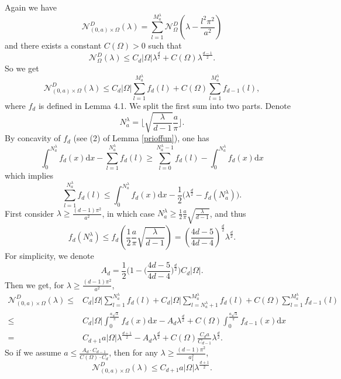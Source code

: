 \documentclass[11pt,letterpaper]{amsart}
\numberwithin{equation}{section}
\theoremstyle{plain}
\theoremstyle{plain}
\numberwithin{equation}{section}
\theoremstyle{remark}
\begin{document}
	Again we have  
	\begin{equation*} \label{333Diri}
		\mathcal N^D_{(0,a)\times \Omega}(\lambda)= \sum_{l=1}^{M_a^\lambda} \mathcal N^D_\Omega (\lambda-\frac{l^2\pi^2}{a^2})
	\end{equation*}
	and	there exists a constant $C(\Omega)>0$ such that 
	\[
	\mathcal N^D_\Omega(\lambda)\le C_d|\Omega|\lambda^{\frac{d}{2}}+ C(\Omega)\lambda^{\frac{d-1}{2}}.
	\] 
	So we get
	\begin{equation}\label{dim3Diri}
		\mathcal N^D_{(0,a)\times \Omega}(\lambda)
		\le 
		C_d |\Omega| \sum_{l=1}^{M_a^\lambda} f_d(l)+ C(\Omega) \sum_{l=1}^{M_a^\lambda}f_{d-1}(l),
	\end{equation}
	where $f_d$ is defined in Lemma 4.1. 
	We split the first sum into two parts. 
	Denote 
	\[N_a^\lambda= \lfloor \sqrt{\frac{\lambda}{d-1}}\frac{a}{\pi} \rfloor.\]
	By concavity of $f_d$ (see (2) of Lemma \ref{prioffun}), one has 
	\[ \int_0^{N_a^\lambda}f_d(x)\mathrm{d}x- \sum_{l=1}^{N_a^\lambda} f_d(l)
	\ge  \sum_{l=0}^{N_a^\lambda-1} f_d(l)- \int_0^{N_a^\lambda} f_d(x)\mathrm{d}x
	\]
	which implies
	\[
	\sum_{l=1}^{N_a^\lambda}f_d(l)\le \int_0^{N_a^\lambda} f_d(x)\mathrm{d}x- \frac{1}{2}\bigg(\lambda^{\frac{d}{2}}- f_d(N_a^\lambda)\bigg).
	\]
	First consider  $\lambda\ge \frac{(d-1)\pi^2}{a^2}$, in which case $N_a^\lambda \ge \frac 12\frac a{\pi}\sqrt{\frac{\lambda}{d-1}}$, and thus 
	\[f_d(N_a^\lambda)  \le f_d(\frac 12\frac a{\pi}\sqrt{\frac{\lambda}{d-1}}) = (\frac{4d-5}{4d-4})^{\frac{d}{2}}\lambda^{\frac d2}.\]
	For simplicity, we denote 
	\[
	A_d=\frac{1}{2}\bigg(1-\big(\frac{4d-5}{4d-4}\big)^{\frac{d}{2}}\bigg)C_d|\Omega|.
	\] 
	Then we get, for $\lambda\ge \frac{(d-1)\pi^2}{a^2}$,  
	\[
	\begin{aligned}
		\mathcal N^D_{(0,a)\times \Omega}(\lambda) 
		\le& C_d|\Omega| \sum_{l=1}^{N_a^\lambda}f_d(l)+ C_d|\Omega| \sum_{l=N_a^\lambda+1}^{M_a^\lambda}f_d(l)+ C(\Omega) \sum_{l=1}^{M_a^\lambda} f_{d-1}(l)\\
		\le& C_d|\Omega|\int_0^{{\frac{a\sqrt\lambda}{\pi}}} f_d(x)\mathrm{d}x -A_d \lambda^{\frac{d}{2}}+C(\Omega)\int_0^{{\frac{a\sqrt\lambda}{\pi}}} f_{d-1}(x)\mathrm{d}x\\
		=& C_{d+1}a|\Omega|\lambda^{\frac{d+1}{2}}-A_d\lambda^{\frac{d}{2}}+C(\Omega)\frac{C_da}{C_{d-1}}\lambda^{\frac{d}{2}}.
	\end{aligned}
	\]
	So if we assume $a\le \frac{A_d\cdot C_{d-1}}{C(\Omega)\cdot C_d}$, then for any $\lambda \ge \frac{(d-1)\pi^2}{a^2_1}$,  
	\begin{equation}\label{pol3}
		\mathcal N^D_{(0,a)\times \Omega}(\lambda)\le C_{d+1}a|\Omega|\lambda^{\frac{d+1}{2}}.
	\end{equation}
	
\end{document}
